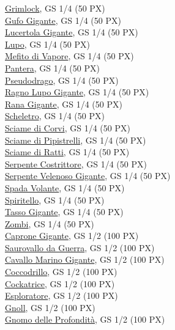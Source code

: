 \begin{multicols}{3}
{\hyperlink{Grimlock}{Grimlock}, GS 1/4 (50 PX)\\
\hyperlink{Gufo Gigante}{Gufo Gigante}, GS 1/4 (50 PX)\\
\hyperlink{Lucertola Gigante}{Lucertola Gigante}, GS 1/4 (50 PX)\\
\hyperlink{Lupo}{Lupo}, GS 1/4 (50 PX)\\
\hyperlink{Mefito di Vapore}{Mefito di Vapore}, GS 1/4 (50 PX)\\
\hyperlink{Pantera}{Pantera}, GS 1/4 (50 PX)\\
\hyperlink{Pseudodrago}{Pseudodrago}, GS 1/4 (50 PX)\\
\hyperlink{Ragno Lupo Gigante}{Ragno Lupo Gigante}, GS 1/4 (50 PX)\\
\hyperlink{Rana Gigante}{Rana Gigante}, GS 1/4 (50 PX)\\
\hyperlink{Scheletro}{Scheletro}, GS 1/4 (50 PX)\\
\hyperlink{Sciame di Corvi}{Sciame di Corvi}, GS 1/4 (50 PX)\\
\hyperlink{Sciame di Pipistrelli}{Sciame di Pipistrelli}, GS 1/4 (50 PX)\\
\hyperlink{Sciame di Ratti}{Sciame di Ratti}, GS 1/4 (50 PX)\\
\hyperlink{Serpente Costrittore}{Serpente Costrittore}, GS 1/4 (50 PX)\\
\hyperlink{Serpente Velenoso Gigante}{Serpente Velenoso Gigante}, GS 1/4 (50 PX)\\
\hyperlink{Spada Volante}{Spada Volante}, GS 1/4 (50 PX)\\
\hyperlink{Spiritello}{Spiritello}, GS 1/4 (50 PX)\\
\hyperlink{Tasso Gigante}{Tasso Gigante}, GS 1/4 (50 PX)\\
\hyperlink{Zombi}{Zombi}, GS 1/4 (50 PX)\\
\hyperlink{Caprone Gigante}{Caprone Gigante}, GS 1/2 (100 PX)\\
\hyperlink{Saurovallo da Guerra}{Saurovallo da Guerra}, GS 1/2 (100 PX)\\
\hyperlink{Cavallo Marino Gigante}{Cavallo Marino Gigante}, GS 1/2 (100 PX)\\
\hyperlink{Coccodrillo}{Coccodrillo}, GS 1/2 (100 PX)\\
\hyperlink{Cockatrice}{Cockatrice}, GS 1/2 (100 PX)\\
\hyperlink{Esploratore}{Esploratore}, GS 1/2 (100 PX)\\
\hyperlink{Gnoll}{Gnoll}, GS 1/2 (100 PX)\\
\hyperlink{Gnomo delle Profondità}{Gnomo delle Profondità}, GS 1/2 (100 PX)\\
}
\end{multicols}
